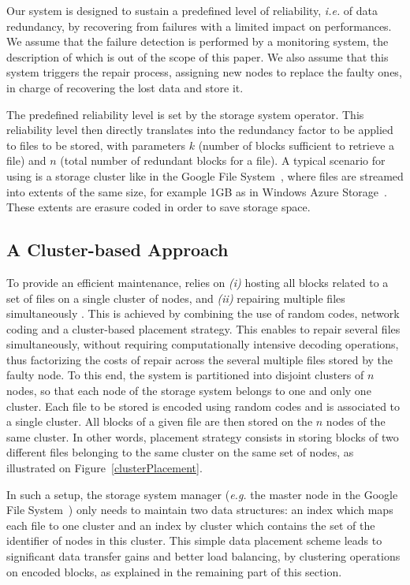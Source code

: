 
Our \crc system is designed to sustain a predefined level
of reliability, \textit{i.e.} of data redundancy, by recovering from
failures with a limited impact on performances. We assume that the
failure detection is performed by a monitoring system, the description of which is out of the scope of this paper. We also assume that this system 
triggers the repair process, assigning new nodes to replace the faulty ones,
in charge of recovering the lost data and store it.

The predefined reliability level  is set by the storage system 
operator. This reliability level then directly translates into the
redundancy factor to be applied to files to be stored, with parameters
$k$ (number of blocks sufficient to retrieve a file) and $n$ (total
number of redundant blocks for a file). A typical scenario for using
\crc is a storage cluster like in the Google File
System~\cite{gfs}, where files are streamed into extents of the same
size, for example 1GB as in Windows Azure Storage~\cite{azure}.
These extents are erasure coded in order to save storage space.

\subsection{A Cluster-based Approach}

To provide an efficient maintenance, \crc relies on \textit{(i)} hosting  all blocks related to a set of files on a single cluster of nodes, and \textit{(ii)} repairing multiple files simultaneously .  This is achieved by combining the use of random codes, network coding and a cluster-based placement strategy. This enables to repair several files simultaneously, without requiring computationally intensive decoding operations, thus factorizing the costs of repair across the several multiple files stored by the faulty node. To this end, the system is  partitioned into disjoint clusters of $n$ nodes,
 so that each node of the storage system belongs to one and only one cluster. 
Each file to be stored is encoded using random codes and is associated to a single cluster. All blocks of a given file are then stored on the $n$ nodes of the same cluster. In other words, \crc placement strategy consists in storing blocks of two different files belonging to the same cluster on the same set of nodes, as illustrated on Figure~\ref{clusterPlacement}.

In such a setup, the storage system manager (\textit{e.g.} the master
node in the Google File System~\cite{gfs}) only needs to maintain two
data structures: an index which maps each file to one cluster and an
index by cluster which contains the set of the identifier of nodes in
this cluster. This simple data placement scheme leads to 
 significant data transfer gains and better load balancing, by clustering operations
on encoded blocks, as explained in the remaining part of this section.

